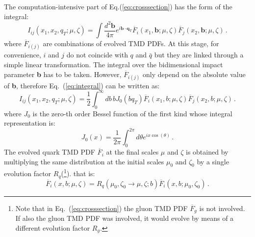 \documentclass[10pt,a4paper]{article}
\begin{document}
The computation-intensive part of Eq.(\ref{eq:crosssection}) has the
form of the integral:
\begin{equation}\label{eq:integral}
I_{ij}(x_1,x_2,q_T;\mu,\zeta)=\int\frac{d^2\mathbf{b}}{4\pi} e^{i \mathbf{b}\cdot \mathbf{q}_T} \overline{F}_i(x_1,\mathbf{b};\mu,\zeta) \overline{F}_{j}(x_2,\mathbf{b};\mu,\zeta)\,.
\end{equation}
where $\overline{F}_{i(j)}$ are combinations of evolved TMD PDFs. At
this stage, for convenience, $i$ and $j$ do not coincide with $q$ and
$\bar{q}$ but they are linked through a simple linear
transformation. The integral over the bidimensional impact parameter
\textbf{b} has to be taken. However, $\overline{F}_{i(j)}$ only depend
on the absolute value of \textbf{b}, therefore Eq.~(\ref{eq:integral})
can be written as:
\begin{equation}\label{eq:integral2}
I_{ij}(x_1,x_2,q_T;\mu,\zeta)=\frac12\int_0^\infty db\,b J_0(bq_T)  \overline{F}_i(x_1,b;\mu,\zeta) \overline{F}_{j}(x_2,b;\mu,\zeta)\,.
\end{equation}
where $J_0$ is the zero-th order Bessel function of the first kind
whose integral representation is:
\begin{equation}
J_0(x) = \frac1{2\pi}\int_0^{2\pi} d\theta e^{ix\cos(\theta)}\,.
\end{equation}
The evolved quark TMD PDF $\overline{F}_i$ at the final scales $\mu$
and $\zeta$ is obtained by multiplying the same distribution at the
initial scales $\mu_0$ and $\zeta_0$ by a single evolution factor
$R_q$(\footnote{Note that in Eq.~(\ref{eq:crosssection}) the gluon TMD
  PDF $\overline{F}_g$ is not involved. If also the gluon TMD PDF was
  involved, it would evolve by means of a different evolution factor
  $R_g$.}).  that is:
\begin{equation}\label{eq:evolution}
  \overline{F}_i(x,b;\mu,\zeta) = R_q(\mu_0,\zeta_0\rightarrow \mu,\zeta;b)
  \overline{F}_i(x,b;\mu_0,\zeta_0)\,.
\end{equation}
\end{document}

